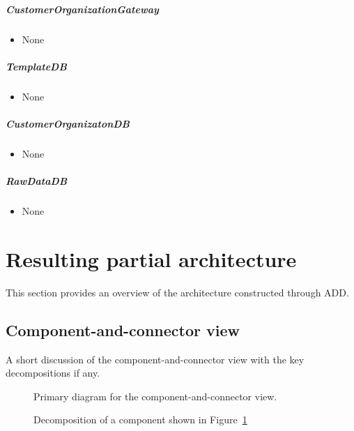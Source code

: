 \documentclass[a4paper,10pt]{article}
\begin{document}
\subparagraph{CustomerOrganizationGateway}
\begin{itemize}
	\item None
\end{itemize}

\subparagraph{TemplateDB}
\begin{itemize}
	\item None
\end{itemize}

\subparagraph{CustomerOrganizatonDB}
\begin{itemize}
	\item None
\end{itemize}

\subparagraph{RawDataDB}
\begin{itemize}
	\item None
\end{itemize}

\section{Resulting partial architecture}\label{sec:architecture}
This section provides an overview of the architecture constructed through ADD\@.

\subsection{Component-and-connector view}
A short discussion of the component-and-connector view with the key
decompositions if any.

\begin{figure}[!htp]
    \centering
    \caption{Primary diagram for the component-and-connector view.
        }\label{fig:cc_main}
\end{figure}

\begin{figure}[!htp]
    \centering
    \caption{Decomposition of a component shown in Figure~\ref{fig:cc_main}
        }\label{fig:decomp_decomp1}
\end{figure}
\end{document}
